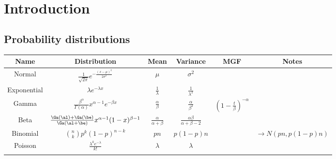 \def\filepath{C:/Users/Owner/Dropbox/Math/templates}





%


%

\pagestyle{fancy}
\chead{} 
\rhead{} 
\lfoot{} 
\cfoot{\thepage} 
\rfoot{} 
\renewcommand{\headrulewidth}{.3pt} 
\setlength\voffset{0in}
\setlength\textheight{648pt}


\tableofcontents
\section{Introduction}
\subsection{Probability distributions}

\begin{tabular}{|c|c|c|c|c|c|}
\hline 
Name & Distribution & Mean & Variance & MGF & Notes\tabularnewline
\hline 
Normal & \textbf{$\frac{1}{\sqrt{2\pi}}e^{-\frac{(x-\mu)^{2}}{2\sigma^{2}}}$} & $\mu$ & $\sigma^{2}$ &  & \tabularnewline
\hline 
Exponential & $\lambda e^{-\lambda x}$ & $\frac{1}{\lambda}$ & $\frac{1}{\lambda^{2}}$ &  & \tabularnewline
\hline 
Gamma & $\frac{\beta^{\alpha}}{\Gamma(\alpha)}x^{\alpha-1}e^{-\beta x}$ & $\frac{\alpha}{\beta}$ & $\frac{\alpha}{\beta^{2}}$ & $(1-\frac{t}{\beta})^{-\alpha}$ & \tabularnewline
\hline 
Beta & $\frac{\Ga(\al)+\Ga(\be)}{\Ga(\al+\be)}{x^{\alpha-1}(1-x)^{\beta-1}}$ & $\frac{\alpha}{\alpha+\beta}$ & $\frac{\alpha\beta}{\alpha+\beta-2}$ &  & \tabularnewline
\hline 
Binomial & $\binom{n}{k}p^{k}(1-p)^{n-k}$ & $pn$ & ${p(1-p)n}$ &  & $\to N(pn,{p(1-p)n})$\tabularnewline
\hline 
Poisson & $\frac{\lambda^{k}e^{-\lambda}}{k!}$ & $\lambda$ & $\lambda$ &  & \tabularnewline
\hline 
 &  &  &  &  & \tabularnewline
\hline 
\end{tabular}

